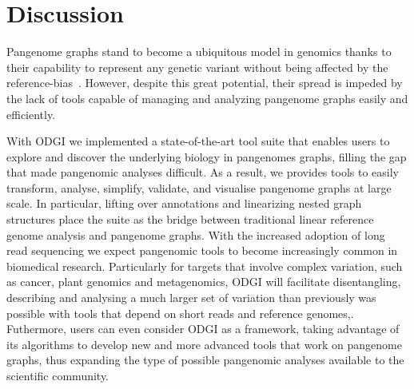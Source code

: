 \documentclass{bioinfo}
\begin{document}












\section{Discussion}
Pangenome graphs stand to become a ubiquitous model in genomics thanks to their capability to represent any genetic variant without being affected by the reference-bias~\citep{Eizenga_2020}.
However, despite this great potential, their spread is impeded by the lack of tools capable of managing and analyzing pangenome graphs easily and efficiently.

With ODGI we implemented a state-of-the-art tool suite that enables users to explore and discover the underlying biology in pangenomes graphs, filling the gap that made pangenomic analyses difficult.
As a result, we provides tools to easily transform, analyse, simplify, validate, and visualise pangenome graphs at large scale.
In particular, lifting over annotations and linearizing nested graph structures place the suite as the bridge between traditional linear reference genome analysis and pangenome graphs.
With the increased adoption of long read sequencing we expect pangenomic tools to become increasingly common in biomedical research.
Particularly for targets that involve complex variation, such as cancer, plant genomics and metagenomics, ODGI will facilitate disentangling,
describing and analysing a much larger set of variation than previously was possible with tools that depend on short reads and reference genomes,.
Futhermore, users can even consider ODGI as a framework, taking advantage of its algorithms to develop new and more advanced tools that work on pangenome graphs,
thus expanding the type of possible pangenomic analyses available to the scientific community.
\end{document}
